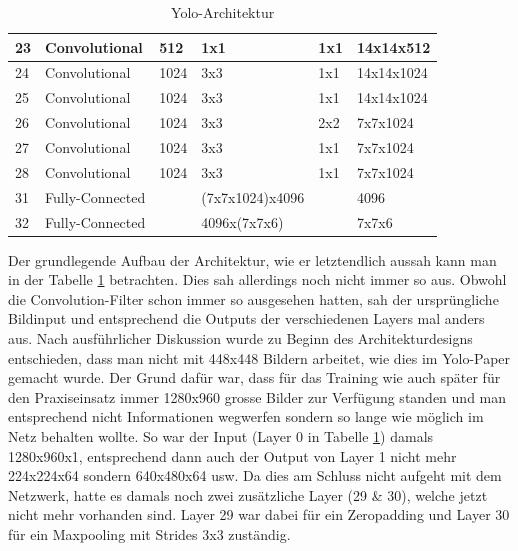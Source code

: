 \begin{table}
\begin{tabularx}{1.1\textwidth}{|l|l|l|l|l|X|}
\hline  	23	& Convolutional		& 512	& 1x1	& 1x1	& 14x14x512	\\
\hline  	24	& Convolutional		& 1024	& 3x3	& 1x1	& 14x14x1024	\\
\hline  	25	& Convolutional		& 1024	& 3x3	& 1x1	& 14x14x1024	\\
\hline  	26	& Convolutional		& 1024	& 3x3	& 2x2	& 7x7x1024	\\
\hline  	27	& Convolutional		& 1024	& 3x3	& 1x1	& 7x7x1024	\\
\hline  	28	& Convolutional		& 1024	& 3x3	& 1x1	& 7x7x1024	\\
\hline 	31	& Fully-Connected	&		&(7x7x1024)x4096	&	& 4096  \\
\hline  	32	& Fully-Connected	&		& 4096x(7x7x6)	&	& 7x7x6 \\
\hline 	
\end{tabularx}
\caption{Yolo-Architektur}
\label{tbl:yolo_architektur}
\end{table}


Der grundlegende Aufbau der Architektur, wie er letztendlich aussah kann man in der Tabelle \ref{tbl:yolo_architektur} betrachten. 
Dies sah allerdings noch nicht immer so aus.
Obwohl die Convolution-Filter schon immer so ausgesehen hatten, sah der ursprüngliche Bildinput und entsprechend die Outputs der verschiedenen Layers mal anders aus.
Nach ausführlicher Diskussion \cite{PrivateCommunication} wurde zu Beginn des Architekturdesigns entschieden, dass man nicht mit 448x448 Bildern arbeitet, wie dies im Yolo-Paper \cite{yolo} gemacht wurde.
Der Grund dafür war, dass für das Training wie auch später für den Praxiseinsatz immer 1280x960 grosse Bilder zur Verfügung standen und man entsprechend nicht Informationen \grqq{}wegwerfen\grqq{} sondern so lange wie möglich im Netz behalten wollte.
So war der Input (Layer 0 in Tabelle \ref{tbl:yolo_architektur}) damals 1280x960x1, entsprechend dann auch der Output von Layer 1 nicht mehr 224x224x64 sondern 640x480x64 usw.
Da dies am Schluss nicht aufgeht mit dem Netzwerk, hatte es damals noch zwei zusätzliche Layer (29 \& 30), welche jetzt nicht mehr vorhanden sind.
Layer 29 war dabei für ein Zeropadding und Layer 30 für ein Maxpooling mit Strides 3x3 zuständig.


